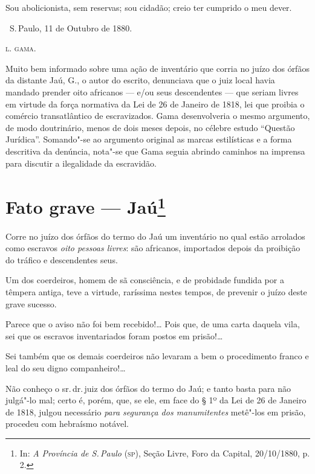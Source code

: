 Sou abolicionista, sem reservas; sou cidadão; creio ter cumprido o meu
dever.

\bigskip

\hfill\ S.\,Paulo, 11 de Outubro de 1880.\smallskip

\hfill\textsc{l. gama.}

\paginabranca
\mbox{}\vfill
\thispagestyle{empty}

{\small\noindent
Muito bem informado sobre uma
ação de inventário que corria no juízo dos órfãos da distante Jaú, G., o
autor do escrito, denunciava que o juiz local havia mandado prender oito
africanos --- e/ou seus descendentes --- que seriam livres em virtude da
força normativa da Lei de 26 de Janeiro de 1818, lei que proibia o comércio
transatlântico de escravizados. Gama desenvolveria o mesmo argumento, de
modo doutrinário, menos de dois meses depois, no célebre estudo ``Questão
Jurídica''. Somando"-se ao argumento original as marcas estilísticas e a
forma descritiva da denúncia, nota"-se que Gama seguia abrindo caminhos
na imprensa para discutir a ilegalidade da escravidão. }

\chapter{Fato grave --- Jaú\footnote[*]{In: \emph{A Província
  de S.\,Paulo} (\textsc{sp}), Seção Livre, Foro da Capital, 20/10/1880, p. 2.}}

Corre no juízo dos órfãos do termo do Jaú um inventário no qual estão
arrolados como escravos \emph{oito pessoas livres}: são africanos,
importados depois da proibição do tráfico e descendentes seus.

Um dos coerdeiros, homem de sã consciência, e de probidade fundida por a
têmpera antiga, teve a virtude, raríssima nestes tempos, de prevenir o
juízo deste grave sucesso.

Parece que o aviso não foi bem recebido!\ldots{} Pois que, de uma carta
daquela vila, sei que os escravos inventariados foram postos em
prisão!\ldots{}

Sei também que os demais coerdeiros não levaram a bem o procedimento
franco e leal do seu digno companheiro!\ldots{}

Não conheço o sr.\,dr.\,juiz dos órfãos do termo do Jaú; e tanto basta
para não julgá"-lo mal; certo é, porém, que, se ele, em face do § 1º da
Lei de 26 de Janeiro de 1818, julgou necessário \emph{para segurança dos
manumitentes} metê"-los em prisão, procedeu com hebraísmo notável.


